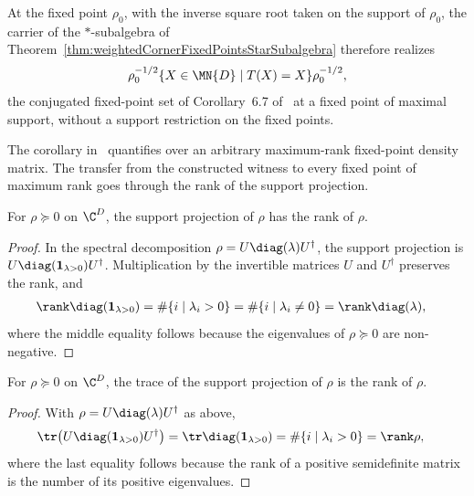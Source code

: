 At the fixed point $\rho_0$, with the inverse square root taken on the
support of $\rho_0$, the carrier of the $*$-subalgebra of
Theorem~\ref{thm:weightedCornerFixedPointsStarSubalgebra} therefore realizes
\begin{align}
    \rho_0^{-1/2}
    \{X\in\MN{D}\mid T(X)=X\}
    \rho_0^{-1/2},
    \notag
\end{align}
the conjugated fixed-point set of Corollary~6.7 of~\cite{Wolf2012Quantum}
at a fixed point of maximal support, without a support restriction on the
fixed points.

The corollary in~\cite{Wolf2012Quantum} quantifies over an arbitrary
maximum-rank fixed-point density matrix. The transfer from the constructed
witness to every fixed point of maximum rank goes through the rank of the
support projection.

\begin{lemma}%
    \label{lem:rank_stationaryProj}
    \leanok
    For $\rho\succeq0$ on $\C^D$, the support projection of $\rho$ has the
    rank of $\rho$.
\end{lemma}

\begin{proof}
    \leanok
    In the spectral decomposition
    $\rho=U\diag(\lambda)U^\dagger$, the support projection is
    $U\diag(\mathbf 1_{\lambda>0})U^\dagger$. Multiplication by the
    invertible matrices $U$ and $U^\dagger$ preserves the rank, and
    \begin{align}
        \rank\diag(\mathbf 1_{\lambda>0})
         & =\#\{i\mid\lambda_i>0\}
        =\#\{i\mid\lambda_i\neq0\}
        =\rank\diag(\lambda),
        \notag
    \end{align}
    where the middle equality follows because the eigenvalues of
    $\rho\succeq0$ are non-negative.
\end{proof}

\begin{lemma}%
    \label{lem:trace_stationaryProj}
    \leanok
    For $\rho\succeq0$ on $\C^D$, the trace of the support projection of
    $\rho$ is the rank of $\rho$.
\end{lemma}

\begin{proof}
    \leanok
    With $\rho=U\diag(\lambda)U^\dagger$ as above,
    \begin{align}
        \tr\!\left(U\diag(\mathbf 1_{\lambda>0})U^\dagger\right)
         & =\tr\diag(\mathbf 1_{\lambda>0})
        =\#\{i\mid\lambda_i>0\}
        =\rank\rho,
        \notag
    \end{align}
    where the last equality follows because the rank of a positive
    semidefinite matrix is the number of its positive eigenvalues.
\end{proof}

